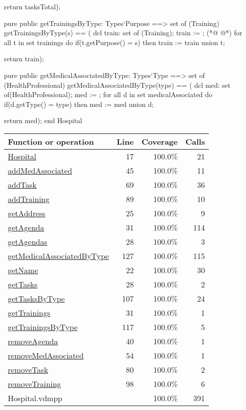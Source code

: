 \begin{vdmpp}[breaklines=true]
   return tasksTotal);
              
 pure public getTrainingsByType: Types`Purpose ==> set of (Training)
  getTrainingsByType(s) == (
   dcl train: set of (Training);
   train := {};
(*@
\label{getMedicalAssociatedByType:127}
@*)
   for all t in set trainings do
    if(t.getPurpose() = s)
     then train := train union {t};
     
   return train);

 pure public getMedicalAssociatedByType: Types`Type ==> set of (HealthProfessional)
  getMedicalAssociatedByType(type) == (
   dcl med: set of(HealthProfessional);
   med := {};
   for all d in set medicalAssociated do
    if(d.getType() = type)
     then med := med union {d};
    
   return med);
end Hospital
\end{vdmpp}
\bigskip
\begin{longtable}{|l|r|r|r|}
\hline
Function or operation & Line & Coverage & Calls \\
\hline
\hline
\hyperref[Hospital:17]{Hospital} & 17&100.0\% & 21 \\
\hline
\hyperref[addMedAssociated:45]{addMedAssociated} & 45&100.0\% & 11 \\
\hline
\hyperref[addTask:69]{addTask} & 69&100.0\% & 36 \\
\hline
\hyperref[addTraining:89]{addTraining} & 89&100.0\% & 10 \\
\hline
\hyperref[getAddress:25]{getAddress} & 25&100.0\% & 9 \\
\hline
\hyperref[getAgenda:31]{getAgenda} & 31&100.0\% & 114 \\
\hline
\hyperref[getAgendas:28]{getAgendas} & 28&100.0\% & 3 \\
\hline
\hyperref[getMedicalAssociatedByType:127]{getMedicalAssociatedByType} & 127&100.0\% & 115 \\
\hline
\hyperref[getName:22]{getName} & 22&100.0\% & 30 \\
\hline
\hyperref[getTasks:28]{getTasks} & 28&100.0\% & 2 \\
\hline
\hyperref[getTasksByType:107]{getTasksByType} & 107&100.0\% & 24 \\
\hline
\hyperref[getTrainings:31]{getTrainings} & 31&100.0\% & 1 \\
\hline
\hyperref[getTrainingsByType:117]{getTrainingsByType} & 117&100.0\% & 5 \\
\hline
\hyperref[removeAgenda:40]{removeAgenda} & 40&100.0\% & 1 \\
\hline
\hyperref[removeMedAssociated:54]{removeMedAssociated} & 54&100.0\% & 1 \\
\hline
\hyperref[removeTask:80]{removeTask} & 80&100.0\% & 2 \\
\hline
\hyperref[removeTraining:98]{removeTraining} & 98&100.0\% & 6 \\
\hline
\hline
Hospital.vdmpp & & 100.0\% & 391 \\
\hline
\end{longtable}

